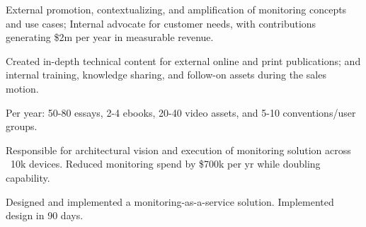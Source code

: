\documentclass[]{deedy-resume-openfont}
\begin{document}
\begin{minipage}[t]{0.64\textwidth}
\descript{}
\begin{tightemize}
	\item External promotion, contextualizing, and amplification of monitoring concepts and use cases; Internal advocate for customer needs, with contributions generating \$2m per year in measurable revenue.
	\item Created in-depth technical content for external online and print \linebreak publications; and internal training, knowledge sharing, and follow-on assets during the sales motion.
	\item Per year: 50-80 essays, 2-4 ebooks, 20-40 video assets, and 5-10 conventions/user groups.
\end{tightemize}
\sectionsep

\descript{}
\begin{tightemize}
	\item Responsible for architectural vision and execution of monitoring solution across ~10k devices. Reduced monitoring spend by \$700k per yr while doubling capability.
\end{tightemize}
\sectionsep

\descript{}
\begin{tightemize}
	\item Designed and implemented a monitoring-as-a-service solution. Implemented design in 90 days.
\end{tightemize}

\end{minipage}
%
%
%
%
%
\end{document}
